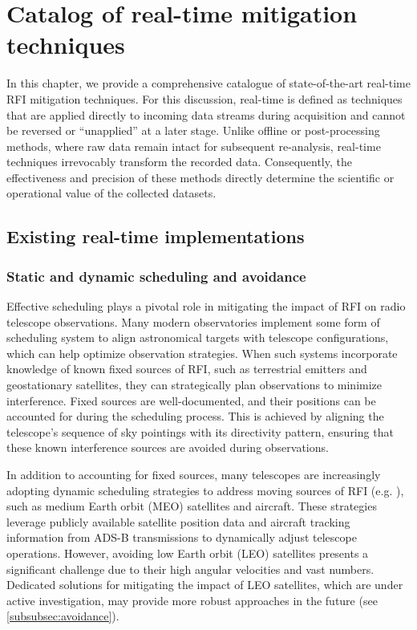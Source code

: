 \section{Catalog of real-time mitigation techniques}
\label{section:hardware:catalog}

In this chapter, we provide a comprehensive catalogue of state-of-the-art real-time RFI mitigation techniques. For this discussion, real-time is defined as techniques that are applied directly to incoming data streams during acquisition and cannot be reversed or ``unapplied'' at a later stage. Unlike offline or post-processing methods, where raw data remain intact for subsequent re-analysis, real-time techniques irrevocably transform the recorded data. Consequently, the effectiveness and precision of these methods directly determine the scientific or operational value of the collected datasets.

\subsection{Existing real-time implementations}
\label{subsection:hardware:catalog:existing}
\subsubsection{Static and dynamic scheduling and avoidance}
Effective scheduling plays a pivotal role in mitigating the impact of RFI on radio telescope observations.
Many modern observatories implement some form of scheduling system to align astronomical targets with telescope configurations, which can help optimize observation strategies. When such systems incorporate knowledge of known fixed sources of RFI, such as terrestrial emitters and geostationary satellites, they can strategically plan observations to minimize interference.
Fixed sources are well-documented, and their positions can be accounted for during the scheduling process. This is achieved by aligning the telescope's sequence of sky pointings with its directivity pattern, ensuring that these known interference sources are avoided during observations.

In addition to accounting for fixed sources, many telescopes are increasingly adopting dynamic scheduling strategies to address moving sources of RFI (e.g. \cite{guzman2016status,luo2018cost}), such as medium Earth orbit (MEO) satellites and aircraft. These strategies leverage publicly available satellite position data and aircraft tracking information from ADS-B transmissions to dynamically adjust telescope operations. However, avoiding low Earth orbit (LEO) satellites presents a significant challenge due to their high angular velocities and vast numbers. Dedicated solutions for mitigating the impact of LEO satellites, which are under active investigation, may provide more robust approaches in the future (see \ref{subsubsec:avoidance}).

